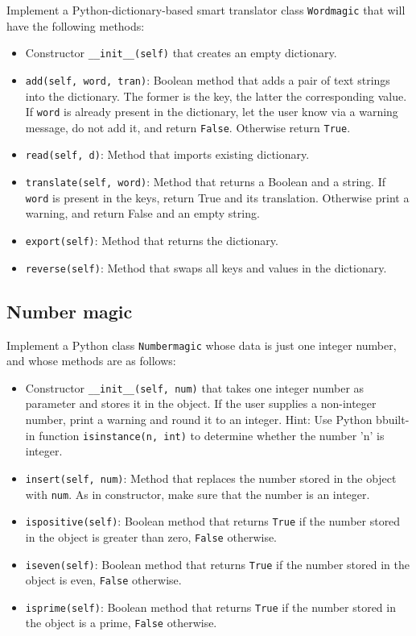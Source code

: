 Implement a Python-dictionary-based smart translator class {\tt Wordmagic} that 
will have the following methods:
\begin{itemize}
\item Constructor {\tt \_\_init\_\_(self)} that creates an empty dictionary.
\item {\tt add(self, word, tran)}: Boolean method that adds a pair of text strings into 
      the dictionary. The former is the key, the latter the corresponding value. 
      If {\tt word} is already present in the dictionary,
      let the user know via a warning message, do not add it, and return {\tt False}. 
      Otherwise return {\tt True}.
\item {\tt read(self, d)}: Method that imports existing dictionary.
\item {\tt translate(self, word)}: Method that returns a Boolean and a string. If {\tt word}   
      is present in the keys, return True and its translation. Otherwise print a warning,
      and return False and an empty string.
\item {\tt export(self)}: Method that returns the dictionary.
\item {\tt reverse(self)}: Method that swaps all keys and values in the dictionary.
\end{itemize}


\subsection{Number magic}\label{numbermagic}

Implement a Python class {\tt Numbermagic} whose data is just one integer number, and 
whose methods are as follows:
\begin{itemize}
\item Constructor {\tt \_\_init\_\_(self, num)} that takes one integer number as parameter and stores it in the object. 
      If the user supplies a non-integer number, print a warning and round it to an integer.
      Hint: Use Python bbuilt-in function {\tt isinstance(n, int)} to determine whether 
      the number 'n' is integer.
\item {\tt insert(self, num)}: Method that replaces the number stored in the object with {\tt num}.
      As in constructor, make sure that the number is an integer.
\item {\tt ispositive(self)}: Boolean method that returns {\tt True} if the number stored in the object is 
      greater than zero, {\tt False} otherwise.
\item {\tt iseven(self)}: Boolean method that returns {\tt True} if the number stored in the object is even,
      {\tt False} otherwise.
\item {\tt isprime(self)}: Boolean method that returns {\tt True} if the number stored in the object is a prime,
      {\tt False} otherwise.
\end{itemize}

